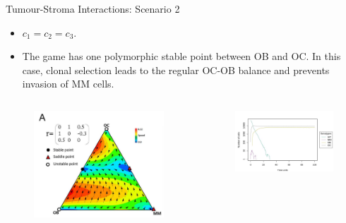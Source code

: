 \begin{frame}{Tumour-Stroma Interactions: Scenario 2}
    \begin{itemize}
        \item $c_1=c_2=c_3$.
        \item The game has one polymorphic stable point between OB and OC. In this case, clonal selection leads to the regular OC-OB balance and prevents invasion of MM cells.
    \end{itemize}
    
    \begin{columns}
        \begin{column}{0.4\textwidth}
            \begin{figure}[t]
                \includegraphics[width=0.9\linewidth]{img/Scenario2.png}
            \end{figure}
        \end{column}
        \begin{column}{0.6\textwidth}
            \begin{figure}[t]
                \includegraphics[width=0.9\linewidth]{img/scenario2_tr.jpg}
            \end{figure}
        \end{column}
    \end{columns}
\end{frame}